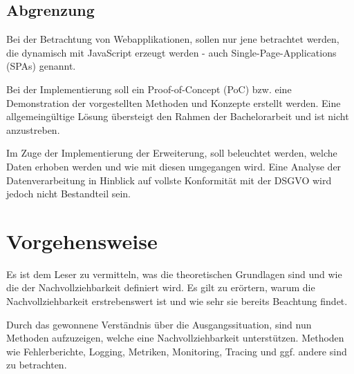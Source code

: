 \subsection{Abgrenzung}


Bei der Betrachtung von Webapplikationen, sollen nur jene betrachtet werden, die dynamisch mit JavaScript erzeugt werden - auch Single-Page-Applications (SPAs) genannt.

Bei der Implementierung soll ein Proof-of-Concept (PoC) bzw. eine Demonstration der vorgestellten Methoden und Konzepte erstellt werden. Eine allgemeingültige Lösung übersteigt den Rahmen der Bachelorarbeit und ist nicht anzustreben.


Im Zuge der Implementierung der Erweiterung, soll beleuchtet werden, welche Daten erhoben werden und wie mit diesen umgegangen wird. Eine Analyse der Datenverarbeitung in Hinblick auf vollste Konformität mit der DSGVO wird jedoch nicht Bestandteil sein.

\pagebreak

\section{Vorgehensweise}

Es ist dem Leser zu vermitteln, was die theoretischen Grundlagen sind und wie die der Nachvollziehbarkeit definiert wird. Es gilt zu erörtern, warum die Nachvollziehbarkeit erstrebenswert ist und wie sehr sie bereits Beachtung findet.

Durch das gewonnene Verständnis über die Ausgangssituation, sind nun Methoden aufzuzeigen, welche eine Nachvollziehbarkeit unterstützen. Methoden wie Fehlerberichte, Logging, Metriken, Monitoring, Tracing und ggf. andere sind zu betrachten.

